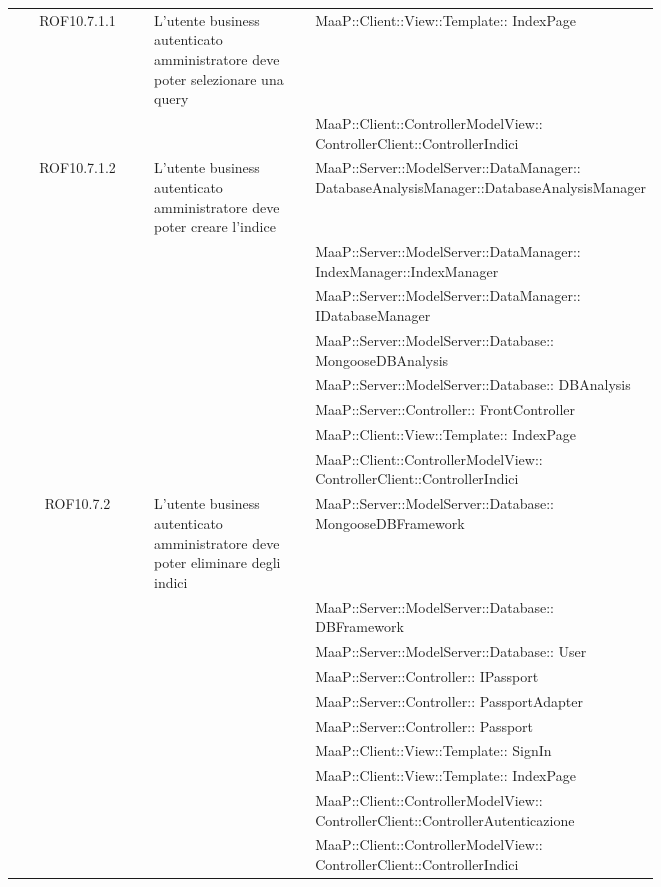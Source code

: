 \begin{center}
\begin{longtable}{|c|p{0.25\linewidth}|p{0.5\linewidth}|}
\midrule
ROF10.7.1.1
& L'utente business autenticato amministratore deve poter selezionare una query
& MaaP::Client::View::Template:: IndexPage\\
& & MaaP::Client::ControllerModelView:: ControllerClient::ControllerIndici\\

\midrule
ROF10.7.1.2
& L'utente business autenticato amministratore deve poter creare l'indice
& MaaP::Server::ModelServer::DataManager:: DatabaseAnalysisManager::DatabaseAnalysisManager\\
& & MaaP::Server::ModelServer::DataManager:: IndexManager::IndexManager\\
& & MaaP::Server::ModelServer::DataManager:: IDatabaseManager\\
& & MaaP::Server::ModelServer::Database:: MongooseDBAnalysis\\
& & MaaP::Server::ModelServer::Database:: DBAnalysis\\
& & MaaP::Server::Controller:: FrontController\\
& & MaaP::Client::View::Template:: IndexPage\\
& & MaaP::Client::ControllerModelView:: ControllerClient::ControllerIndici\\

\midrule
ROF10.7.2
& L'utente business autenticato amministratore deve poter eliminare degli indici
& MaaP::Server::ModelServer::Database:: MongooseDBFramework\\
& & MaaP::Server::ModelServer::Database:: DBFramework\\
& & MaaP::Server::ModelServer::Database:: User\\
& & MaaP::Server::Controller:: IPassport\\
& & MaaP::Server::Controller:: PassportAdapter\\
& & MaaP::Server::Controller:: Passport\\
& & MaaP::Client::View::Template:: SignIn\\
& & MaaP::Client::View::Template:: IndexPage\\
& & MaaP::Client::ControllerModelView:: ControllerClient::ControllerAutenticazione\\
& & MaaP::Client::ControllerModelView:: ControllerClient::ControllerIndici\\


\end{longtable}
\end{center}
